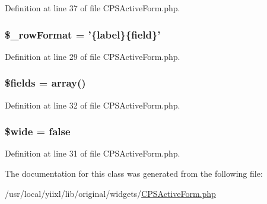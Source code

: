 Definition at line 37 of file CPSActiveForm.php.

\hypertarget{classCPSActiveForm_a9fb53050fa5baafba27e9adcd107eabc}{
\subsubsection[{\$\_\-rowFormat}]{\setlength{\rightskip}{0pt plus 5cm}\$\_\-rowFormat = '\{label\}\{field\}'}}
\label{classCPSActiveForm_a9fb53050fa5baafba27e9adcd107eabc}


Definition at line 29 of file CPSActiveForm.php.

\hypertarget{classCPSActiveForm_ab2303c817e3b402b77b7f99627b9c319}{
\subsubsection[{\$fields}]{\setlength{\rightskip}{0pt plus 5cm}\$fields = {\bf array}()}}
\label{classCPSActiveForm_ab2303c817e3b402b77b7f99627b9c319}


Definition at line 32 of file CPSActiveForm.php.

\hypertarget{classCPSActiveForm_a42782d08bb650a69d71220e69d387d85}{
\subsubsection[{\$wide}]{\setlength{\rightskip}{0pt plus 5cm}\$wide = false}}
\label{classCPSActiveForm_a42782d08bb650a69d71220e69d387d85}


Definition at line 31 of file CPSActiveForm.php.



The documentation for this class was generated from the following file:\begin{DoxyCompactItemize}
\item 
/usr/local/yiixl/lib/original/widgets/\hyperlink{CPSActiveForm_8php}{CPSActiveForm.php}\end{DoxyCompactItemize}
